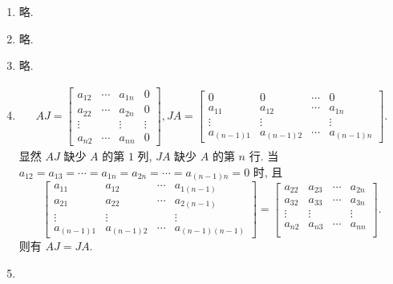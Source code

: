 \documentclass[a4paper, 11pt]{ctexart}
\begin{document}
\begin{enumerate}
    \item %
        略.
    \item %
        略.
    \item %
        略.
    \item %
        \begin{gather*}
            AJ =
            \begin{bmatrix}
                a_{12} & \cdots & a_{1n} & 0 \\
                a_{22} & \cdots & a_{2n} & 0 \\
                \vdots &  & \vdots & \vdots \\
                a_{n2} & \cdots & a_{nn} & 0
            \end{bmatrix},
            JA =
            \begin{bmatrix}
                0 & 0 & \cdots & 0 \\
                a_{11} & a_{12} & \cdots & a_{1n} \\
                \vdots & \vdots &  & \vdots \\
                a_{(n-1)1} & a_{(n-1)2} & \cdots & a_{(n-1)n}
            \end{bmatrix}.
        \end{gather*}
        显然 $AJ$ 缺少 $A$ 的第 $1$ 列, $JA$ 缺少 $A$ 的第 $n$ 行.
        当 $a_{12} = a_{13} = \cdots = a_{1n} = a_{2n} = \cdots = a_{(n-1)n} = 0$ 时, 且
        \[
            \begin{bmatrix}
                a_{11} & a_{12} & \cdots & a_{1(n-1)} \\
                a_{21} & a_{22} & \cdots & a_{2(n-1)} \\
                \vdots & \vdots &  & \vdots \\
                a_{(n-1)1} & a_{(n-1)2} & \cdots & a_{(n-1)(n-1)}
            \end{bmatrix}
            =
            \begin{bmatrix}
                a_{22} & a_{23} & \cdots & a_{2n} \\
                a_{32} & a_{33} & \cdots & a_{3n} \\
                \vdots & \vdots & & \vdots \\
                a_{n2} & a_{n3} & \cdots & a_{nn} \\
            \end{bmatrix}.    
        \]
        则有 $AJ = JA$.
    \item %

\end{enumerate}
\end{document}

